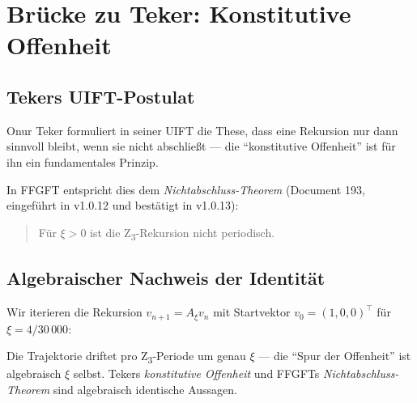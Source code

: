 \section{Brücke zu Teker: Konstitutive Offenheit}
\label{sec:tekermen}

\subsection{Tekers UIFT-Postulat}

Onur Teker formuliert in seiner UIFT die These, dass eine Rekursion nur dann sinnvoll bleibt, wenn sie nicht abschließt — die ``konstitutive Offenheit'' ist für ihn ein fundamentales Prinzip.

In FFGFT entspricht dies dem \emph{Nichtabschluss-Theorem} (Document 193, eingeführt in v1.0.12 und bestätigt in v1.0.13):
\begin{quote}
Für \(\xi > 0\) ist die Z\textsubscript{3}-Rekursion nicht periodisch.
\end{quote}

\subsection{Algebraischer Nachweis der Identität}

Wir iterieren die Rekursion \(v_{n+1} = A_\xi v_n\) mit Startvektor \(v_0 = (1, 0, 0)^\top\) für \(\xi = 4/30\,000\):

\begin{table}[h]
\centering
\caption{Trajektorien der Z\textsubscript{3}-Rekursion: ungestört vs.~gestört}
\end{table}

\begin{keyresult}
Die Trajektorie driftet pro Z\textsubscript{3}-Periode um genau \(\xi\) — die ``Spur der Offenheit'' ist algebraisch \(\xi\) selbst. Tekers \emph{konstitutive Offenheit} und FFGFTs \emph{Nichtabschluss-Theorem} sind algebraisch identische Aussagen.
\end{keyresult}

